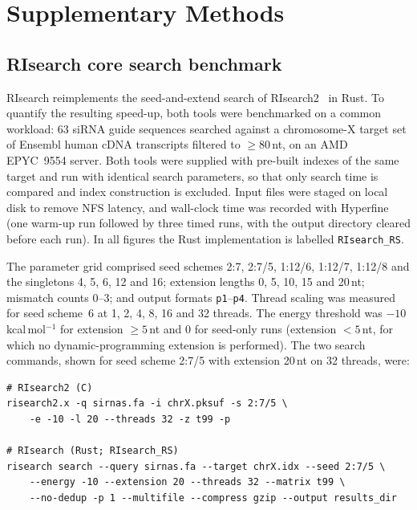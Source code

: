 \setcounter{figure}{0}
\renewcommand{\thefigure}{S\arabic{figure}}
\setcounter{table}{0}
\renewcommand{\thetable}{S\arabic{table}}
\setcounter{section}{0}
\renewcommand{\thesection}{S\arabic{section}}

\section*{Supplementary Methods}

\subsection*{RIsearch core search benchmark}

RIsearch reimplements the seed-and-extend search of RIsearch2~\citep{alkan2017risearch2} in Rust.
To quantify the resulting speed-up, both tools were benchmarked on a common workload: 63 siRNA guide sequences searched against a chromosome-X target set of Ensembl human cDNA transcripts filtered to $\geq 80$\,nt, on an AMD EPYC~9554 server.
Both tools were supplied with pre-built indexes of the same target and run with identical search parameters, so that only search time is compared and index construction is excluded.
Input files were staged on local disk to remove NFS latency, and wall-clock time was recorded with Hyperfine (one warm-up run followed by three timed runs, with the output directory cleared before each run).
In all figures the Rust implementation is labelled \texttt{RIsearch\_RS}.

The parameter grid comprised seed schemes 2:7, 2:7/5, 1:12/6, 1:12/7, 1:12/8 and the singletons 4, 5, 6, 12 and 16; extension lengths 0, 5, 10, 15 and 20\,nt; mismatch counts 0--3; and output formats \texttt{p1}--\texttt{p4}.
Thread scaling was measured for seed scheme~6 at 1, 2, 4, 8, 16 and 32 threads.
The energy threshold was $-10$\,kcal\,mol$^{-1}$ for extension $\geq 5$\,nt and $0$ for seed-only runs (extension $<5$\,nt, for which no dynamic-programming extension is performed).
The two search commands, shown for seed scheme 2:7/5 with extension 20\,nt on 32 threads, were:

\begin{verbatim}
# RIsearch2 (C)
risearch2.x -q sirnas.fa -i chrX.pksuf -s 2:7/5 \
    -e -10 -l 20 --threads 32 -z t99 -p

# RIsearch (Rust; RIsearch_RS)
risearch search --query sirnas.fa --target chrX.idx --seed 2:7/5 \
    --energy -10 --extension 20 --threads 32 --matrix t99 \
    --no-dedup -p 1 --multifile --compress gzip --output results_dir
\end{verbatim}

